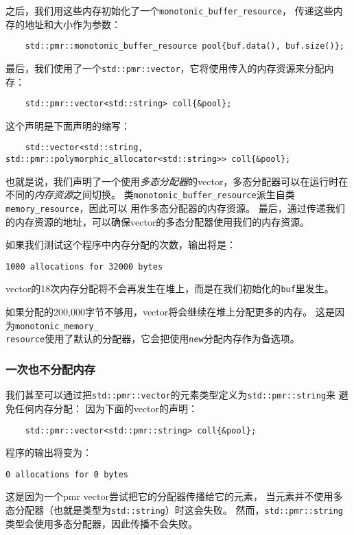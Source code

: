 之后，我们用这些内存初始化了一个\texttt{monotonic\_buffer\_resource}，
传递这些内存的地址和大小作为参数：
\begin{lstlisting}
    std::pmr::monotonic_buffer_resource pool{buf.data(), buf.size()};
\end{lstlisting}
最后，我们使用了一个\texttt{std::pmr::vector}，它将使用传入的内存资源来分配内存：
\begin{lstlisting}
    std::pmr::vector<std::string> coll{&pool};
\end{lstlisting}
这个声明是下面声明的缩写：
\begin{lstlisting}
    std::vector<std::string, std::pmr::polymorphic_allocator<std::string>> coll{&pool};
\end{lstlisting}
也就是说，我们声明了一个使用\emph{多态分配器}的vector，多态分配器可以在运行时在不同的\emph{内存资源}之间切换。
类\texttt{monotonic\_buffer\_resource}派生自类\texttt{memory\_resource}，因此可以
用作多态分配器的内存资源。
最后，通过传递我们的内存资源的地址，可以确保vector的多态分配器使用我们的内存资源。

如果我们测试这个程序中内存分配的次数，输出将是：
\begin{lstlisting}[keywordstyle=\color{black}]
    1000 allocations for 32000 bytes
\end{lstlisting}
vector的18次内存分配将不会再发生在堆上，而是在我们初始化的\texttt{buf}里发生。

如果分配的200,000字节不够用，vector将会继续在堆上分配更多的内存。
这是因为\texttt{monotonic\_memory\_\\
resource}使用了默认的分配器，它会把使用\texttt{new}分配内存作为备选项。

\subsubsection{一次也不分配内存}
我们甚至可以通过把\texttt{std::pmr::vector}的元素类型定义为\texttt{std::pmr::string}来
避免任何内存分配：
因为下面的vector的声明：
\begin{lstlisting}
    std::pmr::vector<std::pmr::string> coll{&pool};
\end{lstlisting}
程序的输出将变为：
\begin{lstlisting}[keywordstyle=\color{black}]
    0 allocations for 0 bytes
\end{lstlisting}
这是因为一个pmr vector尝试把它的分配器传播给它的元素，
当元素并不使用多态分配器（也就是类型为\texttt{std::string}）时这会失败。
然而，\texttt{std::pmr::string}类型会使用多态分配器，因此传播不会失败。

